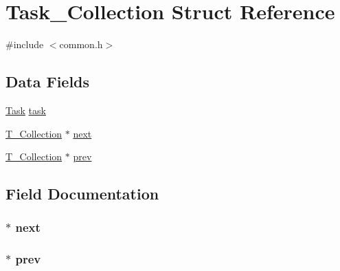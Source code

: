 \hypertarget{struct_task___collection}{}\section{Task\+\_\+\+Collection Struct Reference}
\label{struct_task___collection}


{\ttfamily \#include $<$common.\+h$>$}

\subsection*{Data Fields}
\begin{DoxyCompactItemize}
\item 
\hyperlink{common_8h_a1d107d116293b1dddca4e5d3d2898d00}{Task} \hyperlink{struct_task___collection_a8bcc572b9d73774627be66dd46aa61a8}{task}
\item 
\hyperlink{common_8h_aa9f2ae5a85e60fbcbda672bc74c74e0d}{T\+\_\+\+Collection} $\ast$ \hyperlink{struct_task___collection_a41569fd5e04d2b314ceb3cf5e0eb53de}{next}
\item 
\hyperlink{common_8h_aa9f2ae5a85e60fbcbda672bc74c74e0d}{T\+\_\+\+Collection} $\ast$ \hyperlink{struct_task___collection_a81c5e3039ce942d43d37928b5474315e}{prev}
\end{DoxyCompactItemize}


\subsection{Field Documentation}
\subsubsection[{\texorpdfstring{next}{next}}]{$\ast$ next}\hypertarget{struct_task___collection_a41569fd5e04d2b314ceb3cf5e0eb53de}{}\label{struct_task___collection_a41569fd5e04d2b314ceb3cf5e0eb53de}
\subsubsection[{\texorpdfstring{prev}{prev}}]{$\ast$ prev}\hypertarget{struct_task___collection_a81c5e3039ce942d43d37928b5474315e}{}\label{struct_task___collection_a81c5e3039ce942d43d37928b5474315e}
